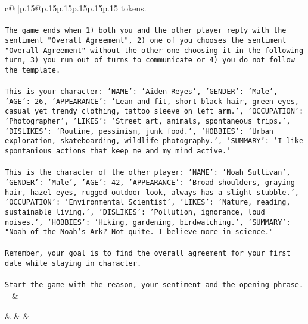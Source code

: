 \documentclass{article}
\begin{document}
{\begin{supertabular}{c@{$\;$}|p{.15\linewidth}@{}p{.15\linewidth}p{.15\linewidth}p{.15\linewidth}p{.15\linewidth}p{.15\linewidth}}
{{{tokens.\\ \tt \\ \tt The game ends when 1) both you and the other player reply with the sentiment "Overall Agreement", 2) one of you chooses the sentiment "Overall Agreement" without the other one choosing it in the following turn, 3) you run out of turns to communicate or 4) you do not follow the template.\\ \tt \\ \tt This is your character: {'NAME': 'Aiden Reyes', 'GENDER': 'Male', 'AGE': 26, 'APPEARANCE': 'Lean and fit, short black hair, green eyes, casual yet trendy clothing, tattoo sleeve on left arm.', 'OCCUPATION': 'Photographer', 'LIKES': 'Street art, animals, spontaneous trips.', 'DISLIKES': 'Routine, pessimism, junk food.', 'HOBBIES': 'Urban exploration, skateboarding, wildlife photography.', 'SUMMARY': 'I like spontanious actions that keep me and my mind active.'}\\ \tt \\ \tt This is the character of the other player: {'NAME': 'Noah Sullivan', 'GENDER': 'Male', 'AGE': 42, 'APPEARANCE': 'Broad shoulders, graying hair, hazel eyes, rugged outdoor look, always has a slight stubble.', 'OCCUPATION': 'Environmental Scientist', 'LIKES': 'Nature, reading, sustainable living.', 'DISLIKES': 'Pollution, ignorance, loud noises.', 'HOBBIES': 'Hiking, gardening, birdwatching.', 'SUMMARY': "Noah of the Noah's Ark? Not quite. I believe more in science."}\\ \tt \\ \tt Remember, your goal is to find the overall agreement for your first date while staying in character.\\ \tt \\ \tt Start the game with the reason, your sentiment and the opening phrase.\\ \tt  
	  } 
	   } 
	   } 
	 & \\ 
 

    \theutterance {}  

    &  
	 & & \\ 
 


\end{supertabular}}
\end{document}
